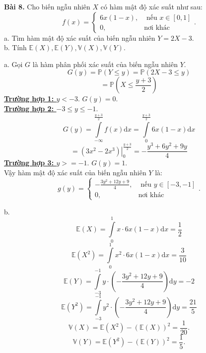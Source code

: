 \documentclass[12pt,a4paper]{article}
\begin{document}
\begin{mybox}
    \textbf{Bài 8.} Cho biến ngẫu nhiên $X$ có hàm mật độ xác suất như sau:
    $$f \left( x \right) = 
    \begin{cases}
        6x \left( {1 - x} \right), &\text{ nếu } x \in \left[ {0, 1} \right]\\
        0, &\text{nơi khác}
    \end{cases}
    .$$
    a. Tìm hàm mật độ xác suất của biến ngẫu nhiên $Y = 2X - 3.$\\
    b. Tính $\mathbb{E} \left( X \right), \mathbb{E} \left( Y \right), \mathbb{V} \left( X \right), \mathbb{V} \left( Y \right).$
\end{mybox}
a. Gọi $G$ là hàm phân phối xác suất của biến ngẫu nhiên $Y.$\\
$$G \left( y \right) = \mathbb{P} \left( {Y \leqslant y} \right) = \mathbb{P} \left( {2X - 3 \leqslant y} \right)$$
$$ =  \mathbb{P} \left( {X \leqslant \frac{y + 3}{2}} \right)$$
\textbf{\underline{Trường hợp 1: }} $y < -3.$ $G \left( y \right) = 0.$\\
\textbf{\underline{Trường hợp 2: }} $-3 \leqslant y \leqslant -1.$ 
$$G \left( y \right) = \int\limits_{- \infty}^{\frac{y + 3}{2}}{f \left(x \right) \mathrm{d}x} = \int\limits_{0}^{\frac{y + 3}{2}}{6x \left( {1 - x} \right)\mathrm{d}x}$$
$$ = \left. {\left( {3{x^2} - 2{x^3}} \right)} \right|_0^{\frac{{y + 3}}{2}} =  - \frac{{{y^3} + 6{y^2} + 9y}}{4}$$
\textbf{\underline{Trường hợp 3: }} $y >= -1.$ $G \left( y \right) = 1.$\\
Vậy hàm mật độ xác suất của biến ngẫu nhiên $Y$ là:
$$g \left( y \right) = 
    \begin{cases}
        - \frac{3y^2 + 12y + 9}{4}, &\text{ nếu } y \in \left[ {-3, -1} \right]\\
        0, &\text{nơi khác}
    \end{cases}
    .$$

b. $$\mathbb{E} \left( X \right) = \int\limits_0^1 {x \cdot 6x\left( {1 - x} \right)\mathrm{d}x}  = \frac{1}{2}$$
$$\mathbb{E} \left( {{X^2}} \right) = \int\limits_0^1 {{x^2} \cdot 6x\left( {1 - x} \right)\mathrm{d}x}  = \frac{3}{{10}}$$
$$\mathbb{E} \left( Y \right) = \int\limits_{ - 3}^{ - 1} {y \cdot \left( { - \frac{{3{y^2} + 12y + 9}}{4}} \right)} \mathrm{d}y =  - 2$$
$$\mathbb{E} \left( {{Y^2}} \right) = \int\limits_{ - 3}^{ - 1} {{y^2} \cdot \left( { - \frac{{3{y^2} + 12y + 9}}{4}} \right)} \mathrm{d}y = \frac{{21}}{5}$$
$$\mathbb{V} \left( X \right) = \mathbb{E} \left( {{X^2}} \right) - \left( {\mathbb{E} \left( X \right)}\right)^2 = \frac{1}{20}.$$
$$\mathbb{V} \left( Y \right) = \mathbb{E} \left( {{Y^2}} \right) - \left( {\mathbb{E} \left( Y \right)}\right)^2 = \frac{1}{5}.$$
\end{document}
